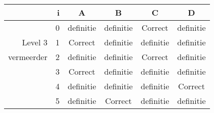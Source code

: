 \begin{tabular}{ rr| c|c|c|c}\hline\hline
     & i & \textbf{A} & \textbf{B} & \textbf{C} & \textbf{D}\\\hline

&0&definitie&definitie&Correct\cellcolor[gray]{0.6}&definitie\\
Level 3 & 1&Correct\cellcolor[gray]{0.6}&definitie&definitie&definitie\\
vermeerder &2&definitie&definitie&Correct\cellcolor[gray]{0.6}&definitie\\
&3&Correct\cellcolor[gray]{0.6}&definitie&definitie&definitie\\
&4&definitie&definitie&definitie&Correct\cellcolor[gray]{0.6}\\
&5&definitie&Correct\cellcolor[gray]{0.6}&definitie&definitie\\
\hline\end{tabular}\par\ \newline

